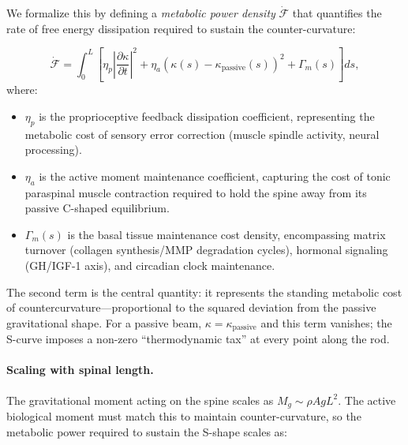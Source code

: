 \documentclass[11pt,a4paper]{article}
\begin{document}
We formalize this by defining a \emph{metabolic power density} $\dot{\mathcal{F}}$ that quantifies the rate of free energy dissipation required to sustain the counter-curvature:

\begin{equation}
\dot{\mathcal{F}} = \int_0^L \left[ \eta_p \left|\frac{\partial \kappa}{\partial t}\right|^2 + \eta_a \left(\kappa(s) - \kappa_{\mathrm{passive}}(s)\right)^2 + \Gamma_m(s) \right] ds,
\label{eq:dissipation}
\end{equation}
where:
\begin{itemize}
    \item $\eta_p$ is the proprioceptive feedback dissipation coefficient, representing the metabolic cost of sensory error correction (muscle spindle activity, neural processing).
    \item $\eta_a$ is the active moment maintenance coefficient, capturing the cost of tonic paraspinal muscle contraction required to hold the spine away from its passive C-shaped equilibrium.
    \item $\Gamma_m(s)$ is the basal tissue maintenance cost density, encompassing matrix turnover (collagen synthesis/MMP degradation cycles), hormonal signaling (GH/IGF-1 axis), and circadian clock maintenance.
\end{itemize}

The second term is the central quantity: it represents the standing metabolic cost of countercurvature---proportional to the squared deviation from the passive gravitational shape. For a passive beam, $\kappa = \kappa_{\mathrm{passive}}$ and this term vanishes; the S-curve imposes a non-zero ``thermodynamic tax'' at every point along the rod.

\paragraph{Scaling with spinal length.} The gravitational moment acting on the spine scales as $M_g \sim \rho A g L^2$. The active biological moment must match this to maintain counter-curvature, so the metabolic power required to sustain the S-shape scales as:
\end{document}
